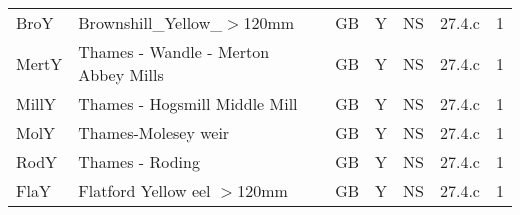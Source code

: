 \begin{table}[htbp]
\begin{tabularx}{\textwidth}{p{1.3cm}p{6.5cm}p{1cm}p{1cm}p{1cm}p{1cm}p{1.4cm}}
  BroY & Brownshill\_Yellow\_$>$120mm & GB & Y & NS & 27.4.c &   1 \\ 
  MertY & Thames - Wandle - Merton Abbey Mills & GB & Y & NS & 27.4.c &   1 \\ 
  MillY & Thames - Hogsmill  Middle Mill & GB & Y & NS & 27.4.c &   1 \\ 
  MolY & Thames-Molesey weir & GB & Y & NS & 27.4.c &   1 \\ 
  RodY & Thames - Roding & GB & Y & NS & 27.4.c &   1 \\ 
  FlaY & Flatford Yellow eel $>$120mm & GB & Y & NS & 27.4.c &   1 \\ 
   \hline
\end{tabularx}
\end{table}
